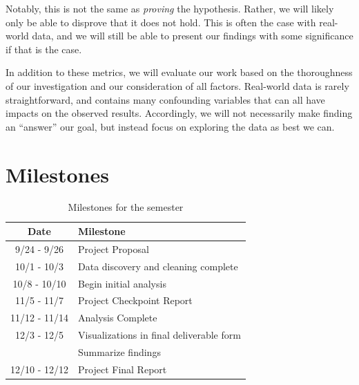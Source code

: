 \documentclass[sigconf, hyperref={colorlinks=true,linkcolor=blue,urlcolor=blue}]{acmart}
\begin{document}
Notably, this is not the same as \textit{proving} the hypothesis. Rather, we will likely
only be able to disprove that it does not hold. This is often the case with real-world data,
and we will still be able to present our findings with some significance if that is the case.

In addition to these metrics, we will evaluate our work based on the thoroughness of our
investigation and our consideration of all factors. Real-world data is rarely straightforward,
and contains many confounding variables that can all have impacts on the observed results.
Accordingly, we will not necessarily make finding an “answer” our goal, but instead focus on
exploring the data as best we can.

\section{Milestones}
\begin{table}[H]
  \caption{Milestones for the semester}
  \label{tab:freq}
  \begin{tabular}{c|l}
    \toprule
    Date & Milestone \\
    \midrule
    9/24 - 9/26   & Project Proposal \\
    10/1 - 10/3   & Data discovery and cleaning complete \\
    10/8 - 10/10  & Begin initial analysis \\
    11/5 - 11/7   & Project Checkpoint Report \\
    11/12 - 11/14 & Analysis Complete \\
    12/3 - 12/5   & Visualizations in final deliverable form \\
                  & Summarize findings \\
    12/10 - 12/12 & Project Final Report \\
    \bottomrule
  \end{tabular}
\end{table}
\end{document}
